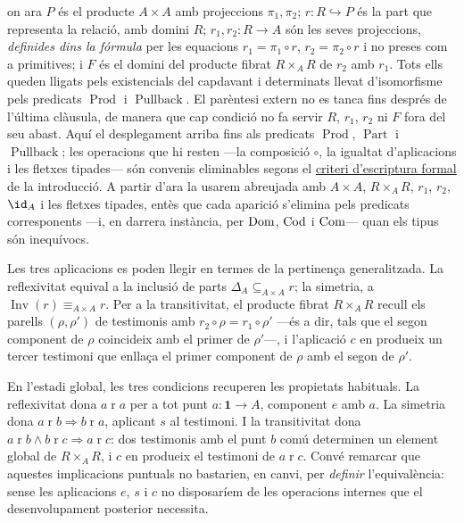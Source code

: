 \begin{notacio}
on ara \(P\) és el producte \(A\times A\) amb projeccions \(\pi_1,\pi_2\); \(r\colon R\hookrightarrow P\) és la part que representa la relació, amb domini \(R\); \(r_1,r_2\colon R\to A\) són les seves projeccions, \emph{definides dins la fórmula} per les equacions \(r_1=\pi_1\circ r\), \(r_2=\pi_2\circ r\) i no preses com a primitives; i \(F\) és el domini del producte fibrat \(R\times_A R\) de \(r_2\) amb \(r_1\). Tots ells queden lligats pels existencials del capdavant i determinats llevat d'isomorfisme pels predicats \(\operatorname{Prod}\) i \(\operatorname{Pullback}\). El parèntesi extern no es tanca fins després de l'última clàusula, de manera que cap condició no fa servir \(R\), \(r_1\), \(r_2\) ni \(F\) fora del seu abast. Aquí el desplegament arriba fins als predicats \(\operatorname{Prod}\), \(\operatorname{Part}\) i \(\operatorname{Pullback}\); les operacions que hi resten ---la composició \(\circ\), la igualtat d'aplicacions i les fletxes tipades--- són convenis eliminables segons el \hyperref[not:criteri-formal]{criteri d'escriptura formal} de la introducció. A partir d'ara la usarem abreujada amb \(A\times A\), \(R\times_A R\), \(r_1\), \(r_2\), \(\id_A\) i les fletxes tipades, entès que cada aparició s'elimina pels predicats corresponents ---i, en darrera instància, per \(\operatorname{Dom}\), \(\operatorname{Cod}\) i \(\operatorname{Com}\)--- quan els tipus són inequívocs.
\end{notacio}

\begin{notacio}\label{not:equivalencia}
Les tres aplicacions es poden llegir en termes de la pertinença generalitzada. La reflexivitat equival a la inclusió de parts \(\Delta_A\subseteq_{A\times A}r\); la simetria, a \(\operatorname{Inv}(r)\equiv_{A\times A}r\). Per a la transitivitat, el producte fibrat \(R\times_A R\) recull els parells \((\rho,\rho')\) de testimonis amb \(r_2\circ\rho=r_1\circ\rho'\) ---és a dir, tals que el segon component de \(\rho\) coincideix amb el primer de \(\rho'\)---, i l'aplicació \(c\) en produeix un tercer testimoni que enllaça el primer component de \(\rho\) amb el segon de \(\rho'\).
\end{notacio}

\begin{observacio}\label{obs:equivalencia-classica}
En l'estadi global, les tres condicions recuperen les propietats habituals. La reflexivitat dona \(a\mathrel{r}a\) per a tot punt \(a\colon\mathbf1\to A\), component \(e\) amb \(a\). La simetria dona \(a\mathrel{r}b\Rightarrow b\mathrel{r}a\), aplicant \(s\) al testimoni. I la transitivitat dona \(a\mathrel{r}b\land b\mathrel{r}c\Rightarrow a\mathrel{r}c\): dos testimonis amb el punt \(b\) comú determinen un element global de \(R\times_A R\), i \(c\) en produeix el testimoni de \(a\mathrel{r}c\). Convé remarcar que aquestes implicacions puntuals no bastarien, en canvi, per \emph{definir} l'equivalència: sense les aplicacions \(e\), \(s\) i \(c\) no disposaríem de les operacions internes que el desenvolupament posterior necessita.
\end{observacio}

